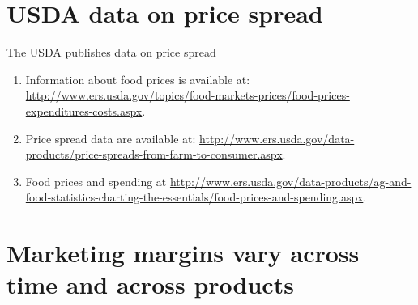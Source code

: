 \documentclass[table,xcolor=pdftex,dvipsnames, handout]{beamer}\usepackage[]{graphicx}\usepackage[]{color}
\begin{document}
\section{USDA data on price spread}

\begin{frame}{The USDA publishes data on price spread}
\begin{enumerate}[label=\textbullet]
  \item Information about food prices is available at: \url{http://www.ers.usda.gov/topics/food-markets-prices/food-prices-expenditures-costs.aspx}.
  \item Price spread data are available at: \url{http://www.ers.usda.gov/data-products/price-spreads-from-farm-to-consumer.aspx}.
  \item Food prices and spending at \url{http://www.ers.usda.gov/data-products/ag-and-food-statistics-charting-the-essentials/food-prices-and-spending.aspx}.
\end{enumerate}
\end{frame}

\section{Marketing margins vary across time and across products}
\end{document}
